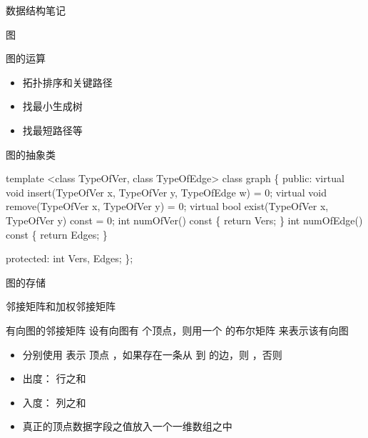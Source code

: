 \documentclass[
  ignorenonframetext,
]{beamer}
\newenvironment{Shaded}{}{}
\newcommand{\NormalTok}[1]{#1}
\providecommand{\tightlist}{%
  \setlength{\itemsep}{0pt}\setlength{\parskip}{0pt}}
\begin{document}
\begin{frame}[fragile]{数据结构笔记}
\begin{block}{图}
\begin{block}{图的运算}
\begin{itemize}
  \begin{itemize}
  \tightlist
  \item
    拓扑排序和关键路径
  \item
    找最小生成树
  \item
    找最短路径等
  \end{itemize}
\end{itemize}
\end{block}

\begin{block}{图的抽象类}
\protect{}\label{ux56feux7684ux62bdux8c61ux7c7b}
\begin{Shaded}
\begin{Highlighting}[]
\NormalTok{template \textless{}class TypeOfVer, class TypeOfEdge\textgreater{}}
\NormalTok{class graph}
\NormalTok{\{}
\NormalTok{  public:}
\NormalTok{    virtual void insert(TypeOfVer x, TypeOfVer y, TypeOfEdge w) = 0;}
\NormalTok{    virtual void remove(TypeOfVer x, TypeOfVer y) = 0;}
\NormalTok{    virtual bool exist(TypeOfVer x, TypeOfVer y) const = 0;}
\NormalTok{    int numOfVer() const}
\NormalTok{    \{}
\NormalTok{      return Vers;}
\NormalTok{    \}}
\NormalTok{    int numOfEdge() const}
\NormalTok{    \{}
\NormalTok{      return Edges;}
\NormalTok{    \}}
 
\NormalTok{  protected:}
\NormalTok{    int Vers, Edges;}
\NormalTok{\};}
\end{Highlighting}
\end{Shaded}
\end{block}

\begin{block}{图的存储}
\protect{}\label{ux56feux7684ux5b58ux50a8}
\begin{block}{邻接矩阵和加权邻接矩阵}
\protect{}\label{ux90bbux63a5ux77e9ux9635ux548cux52a0ux6743ux90bbux63a5ux77e9ux9635}
\begin{block}{有向图的邻接矩阵}
\protect{}\label{ux6709ux5411ux56feux7684ux90bbux63a5ux77e9ux9635}
设有向图有 {} 个顶点，则用一个 {} 的布尔矩阵 {} 来表示该有向图


\begin{itemize}
\tightlist
\item
  分别使用 {} 表示 顶点 {}，如果存在一条从 {} 到 {} 的边，则 {}，否则 {}
\item
  出度：{} 行之和
\item
  入度：{} 列之和
\item
  真正的顶点数据字段之值放入一个一维数组之中
\end{itemize}
\end{block}


\end{block}
\end{block}
\end{block}
\end{frame}
\end{document}
